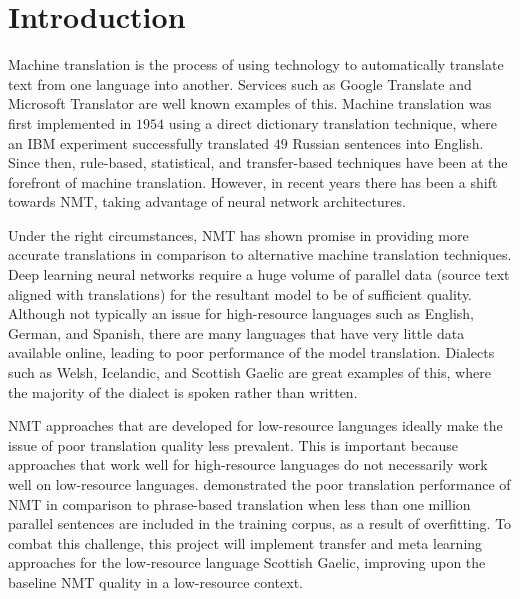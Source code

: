 \chapter{Introduction}
\label{introduction}
\clearpage
Machine translation is the process of using technology to automatically translate text from one language into another. Services such as Google Translate and Microsoft Translator are well known examples of this. 
Machine translation was first implemented in $1954$ using a direct dictionary translation technique, where an IBM experiment successfully translated $49$ Russian sentences into English.
Since then, rule-based, statistical, and transfer-based techniques have been at the forefront of machine translation. However, in recent years there has been a shift towards \Gls{NMT}, taking advantage of neural network architectures.

Under the right circumstances, \acrshort{NMT} has shown promise in providing more accurate translations in comparison to alternative machine translation techniques. Deep learning neural networks require a huge volume of parallel data (source text aligned with translations) for the resultant model to be of sufficient quality. Although not typically an issue for high-resource languages such as English, German, and Spanish, there are many languages that have very little data available online, leading to poor performance of the model translation. Dialects such as Welsh, Icelandic, and Scottish Gaelic are great examples of this, where the majority of the dialect is spoken rather than written.

\acrshort{NMT} approaches that are developed for low-resource languages ideally make the issue of poor translation quality less prevalent. This is important because approaches that work well for high-resource languages do not necessarily work well on low-resource languages. \cite{koehn_six_2017} demonstrated the poor translation performance of \acrshort{NMT} in comparison to phrase-based translation when less than one million parallel sentences are included in the training corpus, as a result of overfitting. To combat this challenge, this project will implement transfer and meta learning approaches for the low-resource language Scottish Gaelic, improving upon the baseline \acrshort{NMT} quality in a low-resource context.


